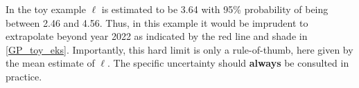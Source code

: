 \documentclass[a4paper]{article}
\begin{document}





In the toy example $\ell$ is estimated to be 3.64 with 95\% probability of being between 2.46 and 4.56. Thus, in this example it would be imprudent to extrapolate beyond year 2022 as indicated by the red line and shade in \autoref{GP_toy_eks}. Importantly, this hard limit is only a rule-of-thumb, here given by the mean estimate of $\ell$. The specific uncertainty should \textbf{always} be consulted in practice.\par 

\end{document}
